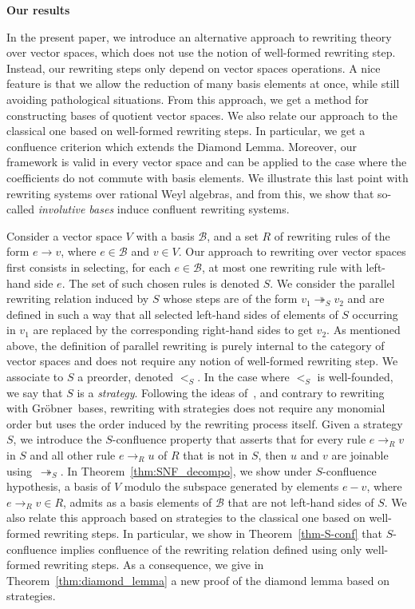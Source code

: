 \documentclass[11pt]{article}
\theoremstyle{definition}
\newcommand\G{Gröbner}
\newcommand\basis{\mathscr{B}}
\newcommand\ordS{<_S}
\newcommand\rewR{\to_R}
\newcommand\parS{\twoheadrightarrow_S}
\begin{document}
\begin{center}
  {\large\bf Our results}
\end{center}

In the present paper, we introduce an alternative approach to rewriting theory
over vector spaces, which does not use the notion of well-formed rewriting
step. Instead, our rewriting steps only depend on vector spaces operations. A
nice feature is that we allow the reduction of many basis elements at once,
while still avoiding pathological situations. From this approach, we get a
method for constructing bases of quotient vector spaces. We also relate our
approach to the classical one based on well-formed rewriting steps. In
particular, we get a confluence criterion which extends the Diamond
Lemma. Moreover, our framework is valid in every vector space and can be applied
to the case where the coefficients do not commute with basis elements. We
illustrate this last point with rewriting systems over rational Weyl algebras,
and from this, we show that so-called {\em involutive bases} \cite{MR1627129}
induce confluent rewriting systems.  \medskip

Consider a vector space $V$ with a basis $\basis$, and a set $R$ of
rewriting rules of the form $e\to v$, where $e\in\basis$ and $v\in V$.
Our approach to rewriting over vector spaces first consists in selecting,
for each $e\in\basis$, at most one rewriting rule with left-hand side
$e$. The set of such chosen rules is denoted $S$. We consider the
parallel rewriting relation induced by $S$ whose steps are of the form
$v_1\parS v_2$ and are defined in such  a way that all selected left-hand
sides of elements of $S$ occurring in $v_1$ are replaced by the
corresponding right-hand sides to get $v_2$. As mentioned above, the
definition of parallel rewriting is purely internal to the category of
vector spaces and does not require any notion of well-formed rewriting
step. We associate to $S$ a preorder, denoted $\ordS$. In the case where $\ordS$ is
well-founded, we say that $S$ is a {\em strategy}. Following the ideas
of~\cite{GuiraudHoffbeckMalbos19}, and contrary to rewriting with \G\
bases, rewriting with strategies does not require any monomial order but
uses the order induced by the rewriting process itself. Given a strategy
$S$, we introduce the $S$-confluence property that asserts that for every
rule $e\rewR v$ in $S$ and all other rule $e\rewR u$ of $R$ that is not
in $S$, then $u$ and $v$ are joinable using~$\parS$. In
Theorem~\ref{thm:SNF_decompo}, we show under $S$-confluence hypothesis,
a basis of $V$ modulo the subspace generated by elements $e-v$, where
$e\rewR v\in R$, admits as a basis elements of $\basis$ that are not
left-hand sides of $S$. We also relate this approach based on strategies
to the classical one based on well-formed rewriting steps. In particular,
we show in Theorem~\ref{thm-S-conf} that $S$-confluence implies
confluence of the rewriting relation defined using only well-formed
rewriting steps. As a consequence, we give in
Theorem~\ref{thm:diamond_lemma} a new proof of the diamond lemma based on
strategies.
\medskip
\end{document}
